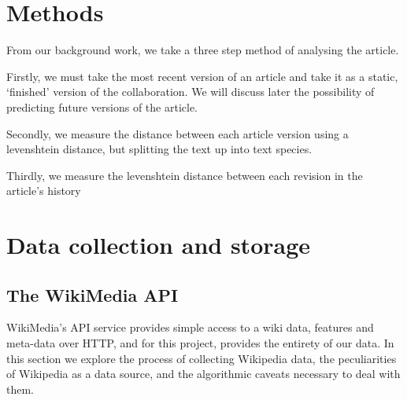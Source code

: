 \section{Methods}
From our background work, we take a three step method of analysing the
article.

Firstly, we must take the most recent version of an article and take
it as a static, `finished' version of the collaboration. We will
discuss later the possibility of predicting future versions of the
article.

Secondly, we measure the distance between each article version using a
levenshtein distance, but splitting the text up into text species.

Thirdly, we measure the levenshtein distance between each revision in
the article's history


\section{Data collection and storage}
\subsection*{The WikiMedia API}
WikiMedia's API service provides simple access to a wiki data,
features and meta-data over HTTP,\cite{wiki-api} and for this project,
provides the entirety of our data. In this section we explore the
process of collecting Wikipedia data, the peculiarities of Wikipedia
as a data source, and the algorithmic caveats necessary to deal with
them.

